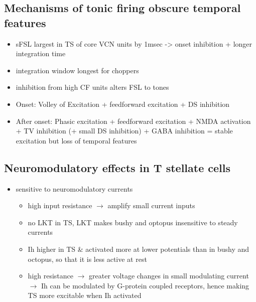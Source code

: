 \subsection{Mechanisms of tonic firing obscure temporal features}
\label{sec-1_4}



\begin{itemize}
\item sFSL largest in TS of core VCN units by 1msec -> onset inhibition + longer integration time \citep{GisbergenGrashuisEtAl:1975,GisbergenGrashuisEtAl:1975a,GisbergenGrashuisEtAl:1975b,YoungRobertEtAl:1988,PaoliniClareyEtAl:2004}
\item integration window longest for choppers \citep{McGinleyOertel:2006}
\item inhibition from high CF units alters FSL to tones \citep{Wickesberg:1996}
\item Onset: Volley of Excitation + feedforward excitation + DS inhibition
\item After onset: Phasic excitation + feedforward excitation + NMDA activation + TV inhibition (+ small DS inhibition) + GABA inhibition = stable excitation but loss of temporal features
\end{itemize}
\subsection{Neuromodulatory effects in T stellate cells}
\label{sec-1_5}



\begin{itemize}
\item sensitive to neuromodulatory currents \citep{FujinoOertel:2001}
\begin{itemize}
\item high input resistance $\rightarrow$ amplify small current inputs \citep{FujinoOertel:2001}
\item no LKT in TS,  LKT makes bushy and optopus insensitive to steady currents \citep{OertelFujino:2001,McGinleyOertel:2006}
\item Ih higher in TS \& activated more at lower potentials than in bushy and octopus, so that it is less active at rest
\item high resistance $\rightarrow$ greater voltage changes in small modulating current $\rightarrow$ Ih can be modulated by G-protein coupled receptors, hence making TS more excitable when Ih activated \citep{RodriguesOertel:2006}
\end{itemize}
\end{itemize}

